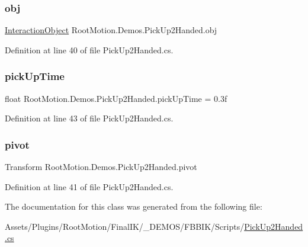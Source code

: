 \subsubsection{\texorpdfstring{obj}{obj}}
{\footnotesize\ttfamily \mbox{\hyperlink{class_root_motion_1_1_final_i_k_1_1_interaction_object}{Interaction\+Object}} Root\+Motion.\+Demos.\+Pick\+Up2\+Handed.\+obj}



Definition at line 40 of file Pick\+Up2\+Handed.\+cs.

\mbox{\label{class_root_motion_1_1_demos_1_1_pick_up2_handed_a37486617c91a86f13c2a22377a04fbc0}} 
\subsubsection{\texorpdfstring{pick\+Up\+Time}{pickUpTime}}
{\footnotesize\ttfamily float Root\+Motion.\+Demos.\+Pick\+Up2\+Handed.\+pick\+Up\+Time = 0.\+3f}



Definition at line 43 of file Pick\+Up2\+Handed.\+cs.

\mbox{\label{class_root_motion_1_1_demos_1_1_pick_up2_handed_a239a14c23e808948ba9f7dc1a61943d1}} 
\subsubsection{\texorpdfstring{pivot}{pivot}}
{\footnotesize\ttfamily Transform Root\+Motion.\+Demos.\+Pick\+Up2\+Handed.\+pivot}



Definition at line 41 of file Pick\+Up2\+Handed.\+cs.



The documentation for this class was generated from the following file\+:\begin{DoxyCompactItemize}
\item 
Assets/\+Plugins/\+Root\+Motion/\+Final\+I\+K/\+\_\+\+D\+E\+M\+O\+S/\+F\+B\+B\+I\+K/\+Scripts/\mbox{\hyperlink{_pick_up2_handed_8cs}{Pick\+Up2\+Handed.\+cs}}\end{DoxyCompactItemize}
